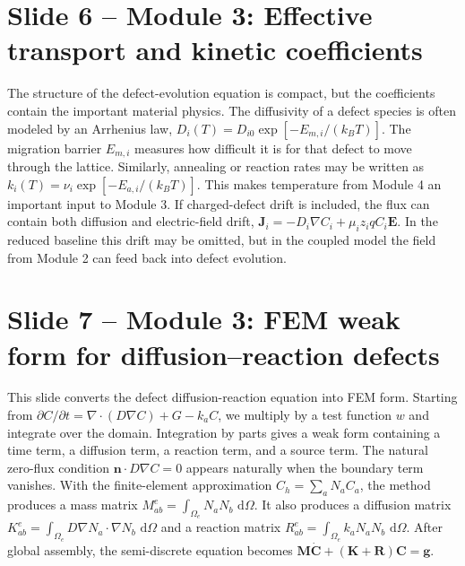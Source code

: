 \documentclass[11pt]{article}
\newcommand{\dd}{\,\mathrm{d}}
\newcommand{\grad}{\nabla}
\newcommand{\divg}{\nabla\!\cdot}
\newcommand{\E}{\bm{E}}
\newcommand{\J}{\bm{J}}
\newcommand{\mat}[1]{\mathbf{#1}}
\newcommand{\vect}[1]{\bm{#1}}
\begin{document}
\section*{Slide 6 -- Module 3: Effective transport and kinetic coefficients}
\begin{scriptbox}
The structure of the defect-evolution equation is compact, but the coefficients contain the important material physics. The diffusivity of a defect species is often modeled by an Arrhenius law, \(D_i(T)=D_{i0}\exp[-E_{m,i}/(k_BT)]\). The migration barrier \(E_{m,i}\) measures how difficult it is for that defect to move through the lattice. Similarly, annealing or reaction rates may be written as \(k_i(T)=\nu_i\exp[-E_{a,i}/(k_BT)]\). This makes temperature from Module 4 an important input to Module 3. If charged-defect drift is included, the flux can contain both diffusion and electric-field drift, \(\J_i=-D_i\grad C_i+\mu_i z_i q C_i\E\). In the reduced baseline this drift may be omitted, but in the coupled model the field from Module 2 can feed back into defect evolution.
\end{scriptbox}

\section*{Slide 7 -- Module 3: FEM weak form for diffusion--reaction defects}
\begin{scriptbox}
This slide converts the defect diffusion-reaction equation into FEM form. Starting from \(\partial C/\partial t=\divg(D\grad C)+G-k_aC\), we multiply by a test function \(w\) and integrate over the domain. Integration by parts gives a weak form containing a time term, a diffusion term, a reaction term, and a source term. The natural zero-flux condition \(\vect{n}\cdot D\grad C=0\) appears naturally when the boundary term vanishes. With the finite-element approximation \(C_h=\sum_aN_aC_a\), the method produces a mass matrix \(M^e_{ab}=\int_{\Omega_e}N_aN_b\,\dd\Omega\). It also produces a diffusion matrix \(K^e_{ab}=\int_{\Omega_e}D\grad N_a\cdot\grad N_b\,\dd\Omega\) and a reaction matrix \(R^e_{ab}=\int_{\Omega_e}k_aN_aN_b\,\dd\Omega\). After global assembly, the semi-discrete equation becomes \(\mat{M}\dot{\vect{C}}+(\mat{K}+\mat{R})\vect{C}=\vect{g}\).
\end{scriptbox}
\end{document}
